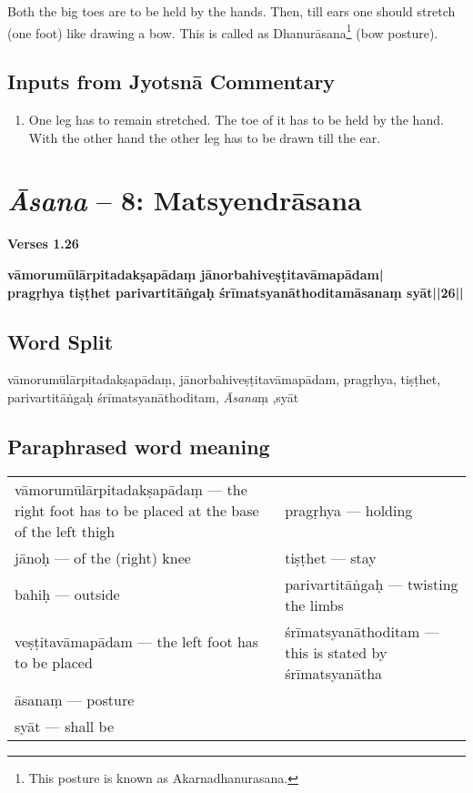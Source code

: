 Both the big toes are to be held by the hands. Then, till ears one should stretch (one foot)  like drawing a bow. This is called as Dhanurāsana\footnote{This posture is known as Akarnadhanurasana.} (bow posture).

\subsection*{Inputs from Jyotsnā Commentary}

\begin{enumerate}
\item One leg has to remain stretched. The toe of it has to be held by the hand.  With the other hand the other leg has to be drawn till the ear. 
\end{enumerate}

\section*{\textit{Āsana} -- 8: Matsyendrāsana}

\noindent \textbf{Verses 1.26}

\begin{shloka}
\textbf{vāmorumūlārpitadakṣapādaṃ jānorbahiveṣṭitavāmapādam|}\\
\textbf{pragṛhya tiṣṭhet parivartitāṅgaḥ śrīmatsyanāthoditamāsanaṃ syāt||26||}
\end{shloka}
\vspace{-10pt}

\subsection*{Word Split}

vāmorumūlārpitadakṣapādaṃ,  jānorbahiveṣṭitavāmapādam, pragṛhya,  tiṣṭhet, parivartitāṅgaḥ śrīmatsyanāthoditam, \textit{Āsana}ṃ ,syāt

\subsection*{Paraphrased word meaning}
\vspace{-10pt}

\begin{longtable}{>{\noindent\raggedright}p{5cm}>{\noindent\raggedright}p{5cm}}
vāmorumūlārpitadakṣapādaṃ --- the right
foot has to be placed at the base of the  
left thigh  & pragṛhya --- holding \tabularnewline
jānoḥ --- of the (right) knee & tiṣṭhet --- stay\tabularnewline
bahiḥ --- outside  & parivartitāṅgaḥ --- twisting the limbs\tabularnewline
veṣṭitavāmapādam --- the left foot has to be placed  & śrīmatsyanāthoditam --- this is stated by śrīmatsyanātha\tabularnewline
āsanaṃ --- posture & \tabularnewline
syāt --- shall be & 
\end{longtable}
\vspace{-10pt}

